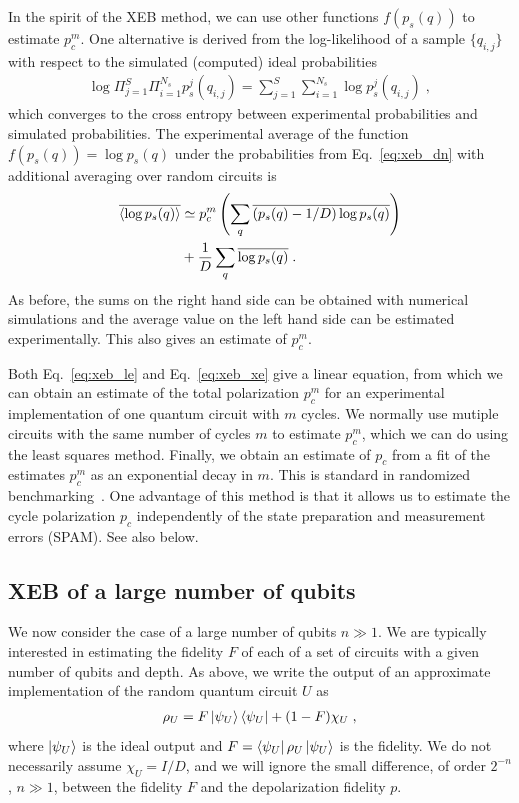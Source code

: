 In the spirit of the XEB method, we can use other functions $f(p_s(q))$ to estimate $p_c^m$. One alternative is derived from the log-likelihood of a sample $\{q_{i,j}\}$ with respect to the simulated (computed) ideal probabilities
\begin{align}
  \log  \Pi_{j=1}^{S} \Pi_{i=1}^{N_s} p_s^j(q_{i,j}) =\sum_{j=1}^{S}\sum_{i=1}^{N_s} \log p_s^j(q_{i,j})\;,
\end{align}
which converges to the cross entropy between experimental probabilities and simulated probabilities. The experimental average of the function $f(p_s(q))= \log p_s(q)$ under the probabilities from Eq.~\eqref{eq:xeb_dn} with additional averaging over random circuits is
\begin{align}
  \overline{\mathinner{\langle{\log p_s(q)} \rangle}} &\simeq p_c^m \left(\sum_q  \overline{(p_s(q)-1/D)\log p_s(q)}\right) \nonumber \\
  &+ \frac 1 D \sum_q \overline{\log p_s(q)}\;.\label{eq:xeb_xe}
\end{align}
As before, the sums on the right hand side  can be obtained with numerical simulations and the average value on the left hand side can be estimated  experimentally. This also gives an estimate of $p_c^m$.

Both Eq.~\eqref{eq:xeb_le} and Eq.~\eqref{eq:xeb_xe} give a linear
equation, from which we can obtain an estimate of the total
polarization $p_c^m$ for an experimental implementation of one quantum
circuit with $m$  cycles. We normally use mutiple circuits with the
same number of cycles $m$ to estimate $p_c^m$, which we can do using
the least squares method. Finally, we obtain an estimate of $p_c$ from a fit of the estimates $p_c^m$ as an exponential decay in $m$. This is standard in randomized
benchmarking~\cite{magesan_characterizing_2012,magesan_robust_2011}. One advantage of this method is
that it allows us to estimate the cycle polarization $p_c$ independently
of the
state preparation and measurement errors (SPAM).
See also below. 


\subsection{XEB of a large number of qubits}\label{sec:xeb_large}

We now consider the case of a large number of qubits $n \gg 1$. We are typically interested in estimating the fidelity
$F$ of each of a set of circuits with a given number of qubits
and depth.
As above, we write the output of an approximate implementation of the random quantum circuit $U$ as
\begin{align}
  \rho_U = F \mathinner{|{\psi_U}\rangle} \mathinner{\langle{\psi_U}|} + (1-F) \chi_U\;,\label{eq:xeb_ru}
\end{align}
where $\mathinner{|{\psi_U}\rangle}$ is the ideal output and $F = \mathinner{\langle{\psi_U}|} \rho_U
\mathinner{|{\psi_U}\rangle}$ is the fidelity. We do not necessarily assume $\chi_U = I /
D$, and we will ignore the small difference, of
order $2^{-n}$, $n \gg 1$, between the
fidelity $F$ and the depolarization  fidelity  $p$.

